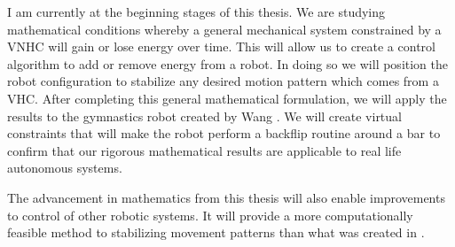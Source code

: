 \documentclass[a4paper,12pt]{article}
\begin{document}
I am currently at the beginning stages of this thesis. We are studying
mathematical conditions whereby a general mechanical system constrained by a
VNHC will gain or lose energy over time. This will allow us to create a control
algorithm to add or remove energy from a robot. In doing so we will position the
robot configuration to stabilize any desired motion pattern which comes from a
VHC. After completing this general mathematical formulation, we will apply the
results to the gymnastics robot created by Wang \cite{xingbo-thesis}. We will
create virtual constraints that will make the robot perform a backflip routine
around a bar to confirm that our rigorous mathematical results are applicable to
real life autonomous systems. 

The advancement in mathematics from this thesis will also enable improvements to
control of other robotic systems. It will provide a more computationally
feasible method to stabilizing movement patterns than what was created in
\cite{manfredi-orbit-stabilization}. 

\printbibliography
\end{document}
